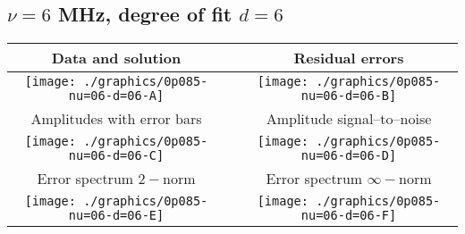 

% 

\clearpage{}
\break{}

\subsection{$\nu = 6$ MHz, degree of fit $d = 6$}

\begin{table}[h]
    \begin{center}
        \begin{tabular}{ccc}
            Data and solution & \quad & Residual errors \\\hline
            \texttt{[image: ./graphics/0p085-nu=06-d=06-A]} &&
            \texttt{[image: ./graphics/0p085-nu=06-d=06-B]} \\[15pt]
            Amplitudes with error bars && Amplitude signal--to--noise \\\hline
            \texttt{[image: ./graphics/0p085-nu=06-d=06-C]} &&
            \texttt{[image: ./graphics/0p085-nu=06-d=06-D]} \\[15pt]
            Error spectrum $2-$norm && Error spectrum $\infty-$norm \\\hline
            \texttt{[image: ./graphics/0p085-nu=06-d=06-E]} &&
            \texttt{[image: ./graphics/0p085-nu=06-d=06-F]} \\[15pt]
        \end{tabular}
    \end{center}
\label{fig:elev=85, nu=6}
\end{table}



\endinput
